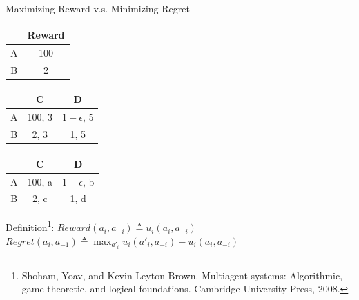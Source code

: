 \documentclass{beamer}
\begin{document}
\begin{frame}{Maximizing Reward v.s. Minimizing Regret}

            \begin{table}[]
                \begin{tabular}{c|c|}
                \cline{2-2}
                                        & Reward \\ \hline
                \multicolumn{1}{|c|}{A} & 100      \\ \hline
                \multicolumn{1}{|c|}{B} & 2      \\ \hline
                \end{tabular}
%
                \begin{tabular}{c|c|c|}
                \cline{2-3}
                                        & C    & D    \\ \hline
                \multicolumn{1}{|c|}{A} & 100, 3 & $1-\epsilon$, 5 \\ \hline
                \multicolumn{1}{|c|}{B} & 2, 3 & 1, 5 \\ \hline
                \end{tabular}
%
                \begin{tabular}{c|c|c|}
                \cline{2-3}
                                        & C    & D    \\ \hline
                \multicolumn{1}{|c|}{A} & 100, a & $1-\epsilon$, b \\ \hline
                \multicolumn{1}{|c|}{B} & 2, c & 1, d \\ \hline
                \end{tabular}
            \end{table}


       \begin{exampleblock}{Definition\footnote{Shoham, Yoav, and Kevin Leyton-Brown. Multiagent systems: Algorithmic, game-theoretic, and logical foundations. Cambridge University Press, 2008.}:}
       $Reward(a_i, a_{-i}) \triangleq u_i(a_i, a_{-i})$
       $Regret(a_i, a_{-1}) \triangleq \max_{a'_i}u_i(a'_i, a_{-i}) - u_i(a_i, a_{-i}) $
       \end{exampleblock}

\end{frame}
\end{document}
